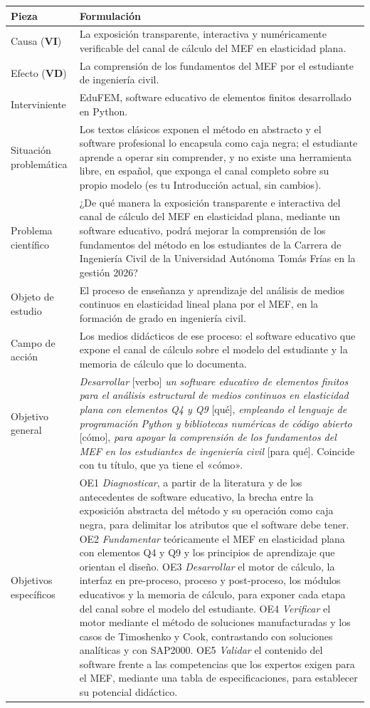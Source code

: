 \documentclass[11pt,a4paper]{article}
\newcommand{\vi}{\textbf{VI}}
\newcommand{\vd}{\textbf{VD}}
\begin{document}
\begin{longtable}{L{3.4cm}L{12.4cm}}
\toprule
\textbf{Pieza} & \textbf{Formulación} \\
\midrule
\endhead
Causa (\vi) & La exposición transparente, interactiva y numéricamente verificable del canal de cálculo del MEF en elasticidad plana. \\
Efecto (\vd) & La comprensión de los fundamentos del MEF por el estudiante de ingeniería civil. \\
Interviniente & EduFEM, software educativo de elementos finitos desarrollado en Python. \\
Situación problemática & Los textos clásicos exponen el método en abstracto y el software profesional lo encapsula como caja negra; el estudiante aprende a operar sin comprender, y no existe una herramienta libre, en español, que exponga el canal completo sobre su propio modelo (es tu Introducción actual, sin cambios). \\
Problema científico & ¿De qué manera la exposición transparente e interactiva del canal de cálculo del MEF en elasticidad plana, mediante un software educativo, podrá mejorar la comprensión de los fundamentos del método en los estudiantes de la Carrera de Ingeniería Civil de la Universidad Autónoma Tomás Frías en la gestión 2026? \\
Objeto de estudio & El proceso de enseñanza y aprendizaje del análisis de medios continuos en elasticidad lineal plana por el MEF, en la formación de grado en ingeniería civil. \\
Campo de acción & Los medios didácticos de ese proceso: el software educativo que expone el canal de cálculo sobre el modelo del estudiante y la memoria de cálculo que lo documenta. \\
Objetivo general & \emph{Desarrollar} [verbo] \emph{un software educativo de elementos finitos para el análisis estructural de medios continuos en elasticidad plana con elementos Q4 y Q9} [qué], \emph{empleando el lenguaje de programación Python y bibliotecas numéricas de código abierto} [cómo], \emph{para apoyar la comprensión de los fundamentos del MEF en los estudiantes de ingeniería civil} [para qué]. Coincide con tu título, que ya tiene el «cómo». \\
Objetivos específicos & OE1 \emph{Diagnosticar}, a partir de la literatura y de los antecedentes de software educativo, la brecha entre la exposición abstracta del método y su operación como caja negra, para delimitar los atributos que el software debe tener. OE2 \emph{Fundamentar} teóricamente el MEF en elasticidad plana con elementos Q4 y Q9 y los principios de aprendizaje que orientan el diseño. OE3 \emph{Desarrollar} el motor de cálculo, la interfaz en pre-proceso, proceso y post-proceso, los módulos educativos y la memoria de cálculo, para exponer cada etapa del canal sobre el modelo del estudiante. OE4 \emph{Verificar} el motor mediante el método de soluciones manufacturadas y los casos de Timoshenko y Cook, contrastando con soluciones analíticas y con SAP2000. OE5 \emph{Validar} el contenido del software frente a las competencias que los expertos exigen para el MEF, mediante una tabla de especificaciones, para establecer su potencial didáctico. \\

\end{longtable}
\end{document}
